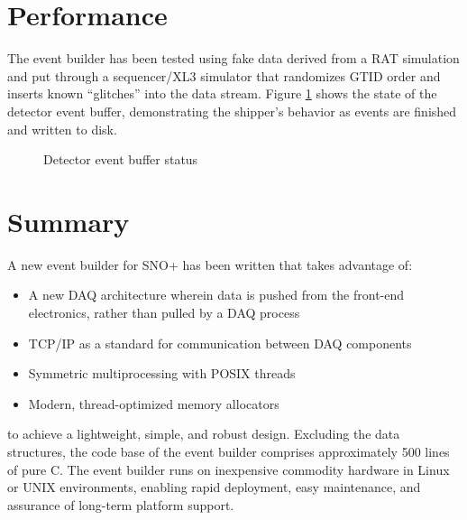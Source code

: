 \documentclass[11pt,twocolumn]{article}
\begin{document}
\section{Performance}
The event builder has been tested using fake data derived from a RAT simulation and put through a sequencer/XL3 simulator that randomizes GTID order and inserts known ``glitches'' into the data stream. Figure \ref{pointers_2k} shows the state of the detector event buffer, demonstrating the shipper's behavior as events are finished and written to disk.
\begin{figure}[htp]
\centering
\caption{Detector event buffer status}
\label{pointers_2k}
\end{figure}

\section{Summary}
A new event builder for SNO+ has been written that takes advantage of:
\begin{itemize}
\item A new DAQ architecture wherein data is pushed from the front-end electronics, rather than pulled by a DAQ process
\item TCP/IP as a standard for communication between DAQ components
\item Symmetric multiprocessing with POSIX threads
\item Modern, thread-optimized memory allocators
\end{itemize}

to achieve a lightweight, simple, and robust design. Excluding the data structures, the code base of the event builder comprises approximately 500 lines of pure C. The event builder runs on inexpensive commodity hardware in Linux or UNIX environments, enabling rapid deployment, easy maintenance, and assurance of long-term platform support.
\end{document}
